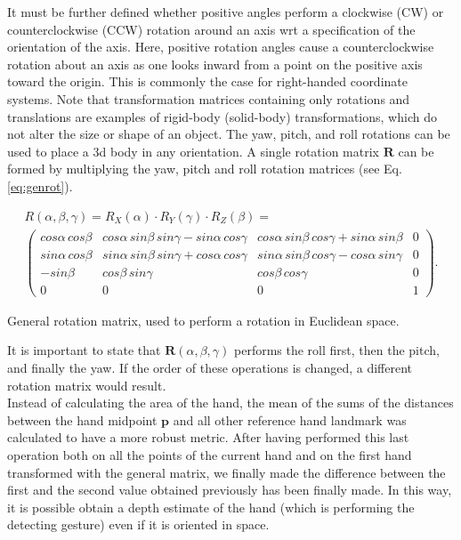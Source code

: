 \noindent It must be further deﬁned whether positive angles perform a clockwise (CW) or counterclockwise (CCW) rotation around an axis \gls{wrt} a speciﬁcation of the orientation of the axis. Here, positive rotation angles cause a counterclockwise rotation about an axis as one looks inward from a point on the positive axis toward the origin. This is commonly the case for right-handed coordinate systems. Note that transformation matrices containing only rotations and translations are examples of rigid-body (solid-body) transformations, which do not alter the size or shape of an object. The yaw, pitch, and roll rotations can be used to place a \gls{3d} body in any orientation. A single rotation matrix $\bm{R}$ can be formed by multiplying the yaw, pitch and roll rotation matrices (see Eq. \ref{eq:genrot}).

\begin{Equation}[H]
	\centering
	\begin{equation}
	    \begin{gathered}
    		R(\alpha, \beta, \gamma) = R_X(\alpha) \cdot R_Y(\gamma) \cdot R_Z(\beta)
    		= \\
            \begin{pmatrix}
                cos\alpha \, cos\beta & cos\alpha \, sin\beta \, sin\gamma-sin\alpha \, cos\gamma & cos\alpha \, sin\beta \, cos\gamma +sin\alpha \, sin\beta & 0 \\
                sin\alpha \, cos\beta & sin\alpha \, sin\beta \, sin\gamma +cos\alpha \, cos\gamma & sin\alpha \, sin\beta \, cos\gamma -cos\alpha \, sin\gamma & 0 \\
                -sin\beta & cos\beta \, sin\gamma & cos\beta \, cos\gamma & 0 \\
                0 & 0 & 0 & 1 
            \end{pmatrix} .
        \end{gathered}
	\end{equation}
	\caption[General Rotation.]{General rotation matrix, used to perform a rotation in Euclidean space.}
	\label{eq:genrot}
\end{Equation}

\noindent It is important to state that $\bm{R}(\alpha, \beta, \gamma)$ performs the roll first, then the pitch, and finally the yaw. If the order of these operations is changed, a different rotation matrix would result. \\

\noindent Instead of calculating the area of the hand, the mean of the sums of the distances between the hand midpoint $\bm{p}$ and all other reference hand landmark was calculated to have a more robust metric. After having performed this last operation both on all the points of the current hand and on the first hand transformed with the general matrix, we finally made the difference between the first and the second value obtained previously has been finally made. In this way, it is possible obtain a depth estimate of the hand (which is performing the detecting gesture) even if it is oriented in space.

